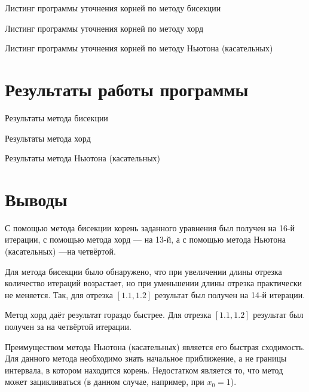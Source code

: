 Листинг программы уточнения корней по методу бисекции
\lstset{inputencoding=utf8, extendedchars=\true}


Листинг программы уточнения корней по методу хорд
\lstset{inputencoding=utf8, extendedchars=\true}


Листинг программы уточнения корней по методу Ньютона (касательных)
\lstset{inputencoding=utf8, extendedchars=\true}


\chapter{Результаты работы программы}

Результаты метода бисекции
\lstset{inputencoding=utf8, extendedchars=\true}


Результаты метода хорд
\lstset{inputencoding=utf8, extendedchars=\true}


Результаты метода Ньютона (касательных)
\lstset{inputencoding=utf8, extendedchars=\true}


\chapter*{Выводы}

С помощью метода бисекции корень заданного уравнения был получен на 16-й итерации,
с помощью метода хорд --- на 13-й,
а с помощью метода Ньютона (касательных) ---на четвёртой.

Для метода бисекции было обнаружено, что при увеличении длины отрезка количество итераций возрастает, но при уменьшении длины отрезка практически не меняется.
Так, для отрезка $ \left[ 1.1, 1.2 \right] $ результат был получен на 14-й итерации.

Метод хорд даёт результат гораздо быстрее.
Для отрезка $ \left[ 1.1, 1.2 \right] $ результат был получен за на четвёртой итерации.

Преимуществом метода Ньютона (касательных) является его быстрая сходимость.
Для данного метода необходимо знать начальное приближение, а не границы интервала, в котором находится корень.
Недостатком является то, что метод может зацикливаться (в данном случае, например, при $x_0 = 1$).



